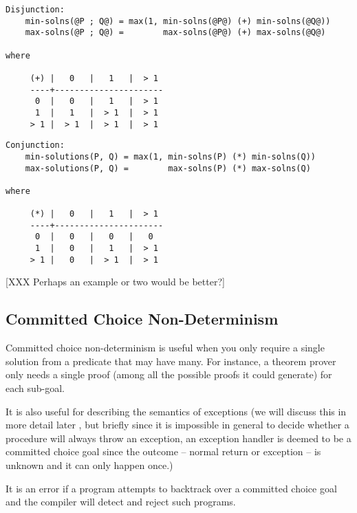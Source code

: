 
\begin{verbatim}
Disjunction:
    min-solns(@P ; Q@) = max(1, min-solns(@P@) (+) min-solns(@Q@))
    max-solns(@P ; Q@) =        max-solns(@P@) (+) max-solns(@Q@)

where

     (+) |   0   |   1   |  > 1
     ----+----------------------
      0  |   0   |   1   |  > 1
      1  |   1   |  > 1  |  > 1
     > 1 |  > 1  |  > 1  |  > 1
\end{verbatim}

\begin{verbatim}
Conjunction:
    min-solutions(P, Q) = max(1, min-solns(P) (*) min-solns(Q))
    max-solutions(P, Q) =        max-solns(P) (*) max-solns(Q)

where

     (*) |   0   |   1   |  > 1
     ----+----------------------
      0  |   0   |   0   |   0
      1  |   0   |   1   |  > 1
     > 1 |   0   |  > 1  |  > 1
\end{verbatim}

[XXX Perhaps an example or two would be better?]

\subsection{Committed Choice Non-Determinism}

Committed choice non-determinism is useful when you only
require a single solution from a predicate that may have many.
For instance, a theorem prover only needs a single proof
(among all the possible proofs it could generate) for each
sub-goal. 

It is also useful for describing the semantics of exceptions
(we will discuss this in more detail later \XXX{}, but briefly
since it is impossible in general to decide whether a
procedure will always throw an exception, an exception handler
is deemed to be a committed choice goal since the outcome --
normal return or exception -- is unknown and it can only happen
once.)


It is an error if a program attempts to backtrack over a
committed choice goal and the compiler will detect and reject
such programs.

